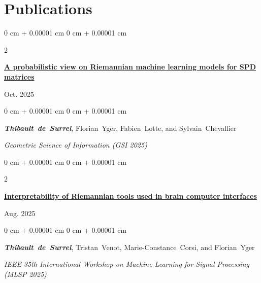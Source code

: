 \documentclass[10pt, letterpaper]{article}
\newenvironment{onecolentry}{
    \begin{adjustwidth}{
        0 cm + 0.00001 cm
    }{
        0 cm + 0.00001 cm
    }
}{
    \end{adjustwidth}
} %
\newenvironment{twocolentry}[2][]{
    \onecolentry
    \def\secondColumn{#2}
    \setcolumnwidth{\fill, 4.5 cm}
    \begin{paracol}{2}
}{
    \switchcolumn \raggedleft \secondColumn
    \end{paracol}
    \endonecolentry
} %
\begin{document}
    \section{Publications}
        \begin{samepage}
            \begin{twocolentry}{
                Oct. 2025
            }
                \textbf{\href{https://arxiv.org/abs/2505.02402}{A probabilistic view on Riemannian machine learning models for SPD matrices}}
            \end{twocolentry}

            \vspace{0.10 cm}
            
            \begin{onecolentry}
                \mbox{\textbf{\textit{Thibault de Surrel}}}, \mbox{Florian Yger}, \mbox{Fabien Lotte}, and \mbox{Sylvain Chevallier} 

                \vspace{0.10 cm}
                
        \textit{Geometric Science of Information (GSI 2025)}
        \end{onecolentry}
        \end{samepage}
        \vspace{0.2cm}

        \begin{samepage}
            \begin{twocolentry}{
                Aug. 2025
            }
                \textbf{\href{https://hal.science/hal-05245110v1/}{Interpretability of Riemannian tools used in brain computer interfaces}}
            \end{twocolentry}

            \vspace{0.10 cm}
            
        \begin{onecolentry}
                \mbox{\textbf{\textit{Thibault de Surrel}}}, \mbox{Tristan Venot}, \mbox{Marie-Constance Corsi}, and \mbox{Florian Yger}

                \vspace{0.10 cm}
                
        \textit{IEEE 35th International Workshop on Machine Learning for Signal Processing (MLSP 2025)}
        \end{onecolentry}
        \end{samepage}
\end{document}
